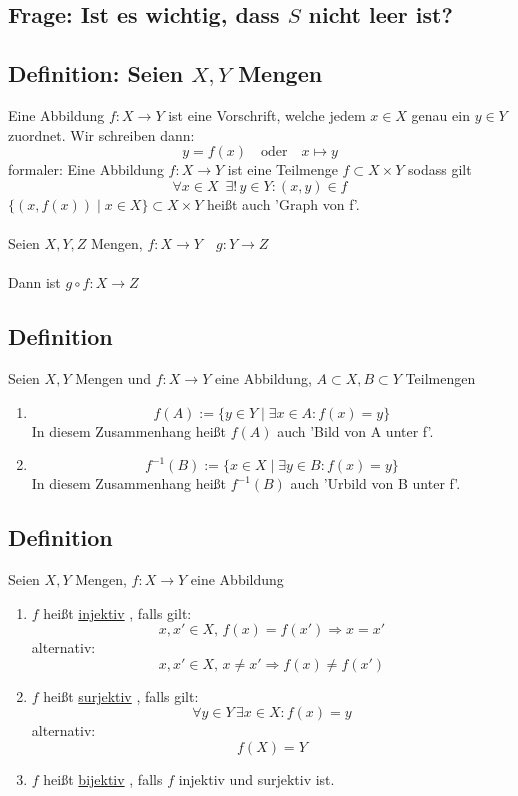\subsection{Frage: Ist es wichtig, dass $S$ nicht leer ist?}

\subsection{Definition: Seien $X,Y$ Mengen}
Eine Abbildung \(f: X \rightarrow Y \) ist eine Vorschrift, welche jedem \(x \in X\) genau ein \(y \in Y\) zuordnet. Wir schreiben dann:
\[ y=f(x) \quad\text{oder} \quad x \mapsto y \]
formaler: Eine Abbildung \(f: X \rightarrow Y \) ist eine Teilmenge \(f \subset X \times Y \) sodass gilt \[ \forall x \in X \enspace \exists ! \,  y \in Y : (x,y) \in f\]
\( \{ (x, f(x) )\mid x \in X \} \subset X \times Y \) heißt auch 'Graph von f'. \\
\\
Seien \( X, Y, Z \) Mengen, \(f : X \rightarrow Y \quad g : Y \rightarrow Z \) \\
\\
Dann ist \( g \circ f : X\rightarrow Z \)

\subsection{Definition}
Seien \(X,Y\) Mengen und \( f : X \rightarrow Y \) eine Abbildung, \( A \subset X, B \subset Y \) Teilmengen

\begin{enumerate}
\item \[ f(A) := \{ y \in Y \mid \exists x \in A : f(x)=y \} \]
In diesem Zusammenhang heißt \( f(A) \) auch 'Bild von A unter f'.
\item \[ f^{-1}(B) := \{ x \in X \mid \exists y \in B : f(x)=y \} \]
In diesem Zusammenhang heißt \(f^{-1} (B) \) auch 'Urbild von B unter f'.
\end{enumerate}

\subsection{Definition} Seien \(X,Y\) Mengen, \(f : X \rightarrow Y \) eine Abbildung
\begin{enumerate}
\item \( f \) heißt \underline{injektiv} , falls gilt:
\[ x,x' \in X , \, f(x)=f(x') \Longrightarrow x=x'\]
alternativ: \[ x,x' \in X , \, x \not= x' \Longrightarrow f(x) \not= f(x') \]
\item \( f\) heißt \underline{surjektiv} , falls gilt:
\[ \forall y \in Y \, \exists x \in X : f(x)=y \]
alternativ: \[  f(X)=Y \]
\item \( f \) heißt \underline{bijektiv} , falls \( f \) injektiv und surjektiv ist.
\end{enumerate}

